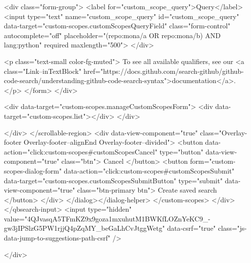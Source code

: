           <div class="form-group">
            <label for="custom_scope_query">Query</label>
            <input
              type="text"
              name="custom_scope_query"
              id="custom_scope_query"
              data-target="custom-scopes.customScopesQueryField"
              class="form-control"
              autocomplete="off"
              placeholder="(repo:mona/a OR repo:mona/b) AND lang:python"
              required
              maxlength="500">
          </div>

          <p class="text-small color-fg-muted">
            To see all available qualifiers, see our <a class="Link--inTextBlock" href="https://docs.github.com/search-github/github-code-search/understanding-github-code-search-syntax">documentation</a>.
          </p>
</form>        </div>

        <div data-target="custom-scopes.manageCustomScopesForm">
          <div data-target="custom-scopes.list"></div>
        </div>

</div>
      </scrollable-region>
      <div data-view-component="true" class="Overlay-footer Overlay-footer--alignEnd Overlay-footer--divided">          <button data-action="click:custom-scopes#customScopesCancel" type="button" data-view-component="true" class="btn">    Cancel
</button>
          <button form="custom-scopes-dialog-form" data-action="click:custom-scopes#customScopesSubmit" data-target="custom-scopes.customScopesSubmitButton" type="submit" data-view-component="true" class="btn-primary btn">    Create saved search
</button>
</div>
</dialog></dialog-helper>
    </custom-scopes>
  </div>
</qbsearch-input>  <input type="hidden" value="4QJvasqA5TFmKZ9x9goza1mxuhutM1BWKfLOZnYeKC9_-gw3jIPSlzG5PW1rjjQ4pZqMY_beGaLhCvJtggWetg" data-csrf="true" class="js-data-jump-to-suggestions-path-csrf" />


          </div>

